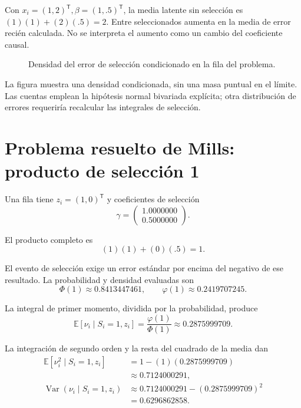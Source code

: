 \documentclass[11pt,a4paper]{article}
\newcommand{\E}{\mathbb E}
\newcommand{\T}{^{\mathsf T}}
\DeclareMathOperator{\Var}{Var}
\begin{document}
Con \(x_i=(1,2)\T,\beta=(1,.5)\T\),
la media latente sin selección es
\((1)(1)+(2)(.5)=2\).
Entre seleccionados aumenta en
la media de error recién calculada.
No se interpreta el aumento como
un cambio del coeficiente causal.


\begin{figure}[H]\centering
{}
\caption{Densidad del error de selección condicionado en la fila del problema.}
\end{figure}

La figura muestra una densidad condicionada,
sin una masa puntual en el límite.
Las cuentas emplean la hipótesis
normal bivariada explícita;
otra distribución de errores requeriría
recalcular las integrales de selección.

\clearpage
\section{Problema resuelto de Mills: producto de selección 1}\label{unidad81}
Una fila tiene \(z_i=(1,0)\T\)
y coeficientes de selección
\[
\gamma=\begin{pmatrix}1.0000000\\0.5000000\end{pmatrix}.
\]

El producto completo es
\[
(1)(1)+(0)(.5)=1.
\]

El evento de selección exige un error estándar
por encima del negativo de ese resultado.
La probabilidad y densidad evaluadas son
\[
\Phi(1)\approx0.8413447461,\qquad\varphi(1)\approx0.2419707245.
\]

La integral de primer momento, dividida
por la probabilidad, produce
\[
\E[\nu_i\mid S_i=1,z_i]
=\frac{\varphi(1)}{\Phi(1)}
\approx0.2875999709.
\]

La integración de segundo orden y
la resta del cuadrado de la media dan
\[
\begin{aligned}
\E[\nu_i^2\mid S_i=1,z_i]&=1-(1)(0.2875999709)\\
&\approx0.7124000291,\\
\Var(\nu_i\mid S_i=1,z_i)&\approx0.7124000291-(0.2875999709)^2\\
&=0.6296862858.\end{aligned}
\]
\end{document}
